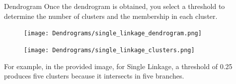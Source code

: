 \documentclass{beamer}
\begin{document}

\begin{frame}{Dendrogram}
    Once the dendrogram is obtained, you select a threshold to determine the number of clusters and the membership in each cluster. \\
       \begin{figure}
            \begin{minipage}[b]{0.48\textwidth}
                \texttt{[image: Dendrograms/single\_linkage\_dendrogram.png]}
             \end{minipage}
            \hfill
            \begin{minipage}[b]{0.48\textwidth}
                \texttt{[image: Dendrograms/single\_linkage\_clusters.png]}
            \end{minipage}
        \end{figure}
    
     For example, in the provided image, for Single Linkage, a threshold of 0.25 produces five clusters because it intersects in five branches.
\end{frame}
\end{document}
